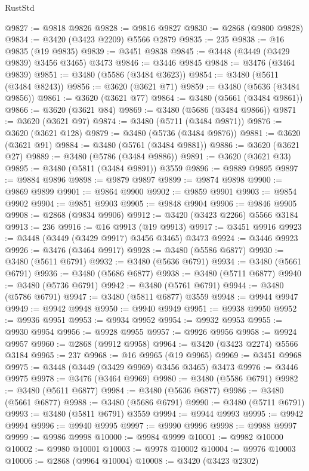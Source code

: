 \begin{lexlean}{RustStd}
\begin{coremodule}
{\begin{coremodule}
{{{{{{{{{{{{{{{{{{{{{{{{{{{{{{{{{{{{{{{{{{{{{{{{{{{{{{{{{{{{{{{{{{{{{{{{{{{{{{{{{{{{{@9827 := @9818 @9826
@9828 := @9816 @9827
@9830 := @2868 (@9800 @9828)
@9834 := @3420 (@3423 @2209) @5566 @2879
@9835 := 235
@9838 := @16 @9835 (@19 @9835)
@9839 := @3451 @9838
@9845 := @3448 (@3449 (@3429 @9839) @3456 @3465) @3473
@9846 := @3446 @9845
@9848 := @3476 (@3464 @9839)
@9851 := @3480 (@5586 (@3484 @3623))
@9854 := @3480 (@5611 (@3484 @8243))
@9856 := @3620 (@3621 @71)
@9859 := @3480 (@5636 (@3484 @9856))
@9861 := @3620 (@3621 @77)
@9864 := @3480 (@5661 (@3484 @9861))
@9866 := @3620 (@3621 @84)
@9869 := @3480 (@5686 (@3484 @9866))
@9871 := @3620 (@3621 @97)
@9874 := @3480 (@5711 (@3484 @9871))
@9876 := @3620 (@3621 @128)
@9879 := @3480 (@5736 (@3484 @9876))
@9881 := @3620 (@3621 @91)
@9884 := @3480 (@5761 (@3484 @9881))
@9886 := @3620 (@3621 @27)
@9889 := @3480 (@5786 (@3484 @9886))
@9891 := @3620 (@3621 @33)
@9895 := @3480 (@5811 (@3484 @9891)) @3559
@9896 := @9889 @9895
@9897 := @9884 @9896
@9898 := @9879 @9897
@9899 := @9874 @9898
@9900 := @9869 @9899
@9901 := @9864 @9900
@9902 := @9859 @9901
@9903 := @9854 @9902
@9904 := @9851 @9903
@9905 := @9848 @9904
@9906 := @9846 @9905
@9908 := @2868 (@9834 @9906)
@9912 := @3420 (@3423 @2266) @5566 @3184
@9913 := 236
@9916 := @16 @9913 (@19 @9913)
@9917 := @3451 @9916
@9923 := @3448 (@3449 (@3429 @9917) @3456 @3465) @3473
@9924 := @3446 @9923
@9926 := @3476 (@3464 @9917)
@9928 := @3480 (@5586 @6877)
@9930 := @3480 (@5611 @6791)
@9932 := @3480 (@5636 @6791)
@9934 := @3480 (@5661 @6791)
@9936 := @3480 (@5686 @6877)
@9938 := @3480 (@5711 @6877)
@9940 := @3480 (@5736 @6791)
@9942 := @3480 (@5761 @6791)
@9944 := @3480 (@5786 @6791)
@9947 := @3480 (@5811 @6877) @3559
@9948 := @9944 @9947
@9949 := @9942 @9948
@9950 := @9940 @9949
@9951 := @9938 @9950
@9952 := @9936 @9951
@9953 := @9934 @9952
@9954 := @9932 @9953
@9955 := @9930 @9954
@9956 := @9928 @9955
@9957 := @9926 @9956
@9958 := @9924 @9957
@9960 := @2868 (@9912 @9958)
@9964 := @3420 (@3423 @2274) @5566 @3184
@9965 := 237
@9968 := @16 @9965 (@19 @9965)
@9969 := @3451 @9968
@9975 := @3448 (@3449 (@3429 @9969) @3456 @3465) @3473
@9976 := @3446 @9975
@9978 := @3476 (@3464 @9969)
@9980 := @3480 (@5586 @6791)
@9982 := @3480 (@5611 @6877)
@9984 := @3480 (@5636 @6877)
@9986 := @3480 (@5661 @6877)
@9988 := @3480 (@5686 @6791)
@9990 := @3480 (@5711 @6791)
@9993 := @3480 (@5811 @6791) @3559
@9994 := @9944 @9993
@9995 := @9942 @9994
@9996 := @9940 @9995
@9997 := @9990 @9996
@9998 := @9988 @9997
@9999 := @9986 @9998
@10000 := @9984 @9999
@10001 := @9982 @10000
@10002 := @9980 @10001
@10003 := @9978 @10002
@10004 := @9976 @10003
@10006 := @2868 (@9964 @10004)
@10008 := @3420 (@3423 @2302)
}}}}}}}}}}}}}}}}}}}}}}}}}}}}}}}}}}}}}}}}}}}}}}}}}}}}}}}}}}}}}}}}}}}}}}}}}}}}}}}}}}}}}
\end{coremodule}}
\end{coremodule}
\end{lexlean}
